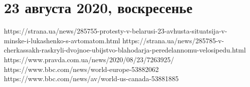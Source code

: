  
 

\section{23 августа 2020, воскресенье}
\label{sec:23_08_2020}

https://strana.ua/news/285755-protesty-v-belarusi-23-avhusta-situatsija-v-minske-i-lukashenko-s-avtomatom.html
https://strana.ua/news/285785-v-cherkassakh-raskryli-dvojnoe-ubijstvo-blahodarja-peredelannomu-velosipedu.html
https://www.pravda.com.ua/news/2020/08/23/7263925/
https://www.bbc.com/news/world-europe-53882062
https://www.bbc.com/news/av/world-us-canada-53881885

